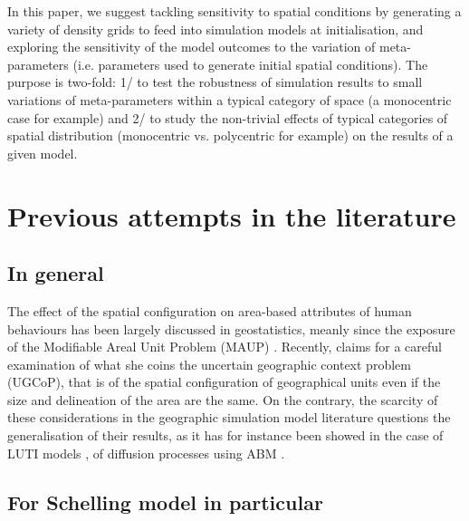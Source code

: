 \documentclass[Afour,sageh,times]{sagej}
\begin{document}
In this paper, we suggest tackling sensitivity to spatial conditions by generating a variety of density grids to feed into simulation models at initialisation, and exploring the sensitivity of the model outcomes to the variation of meta-parameters (i.e. parameters used to generate initial spatial conditions). The purpose is two-fold: 1/ to test the robustness of simulation results to small variations of meta-parameters within a typical category of space (a monocentric case for example) and 2/ to study the non-trivial effects of typical categories of spatial distribution (monocentric vs. polycentric for example) on the results of a given model.


\section{Previous attempts in the literature}

\subsection{In general}

The effect of the spatial configuration on area-based attributes of human behaviours has been largely discussed in geostatistics, meanly since the exposure of the Modifiable Areal Unit Problem (MAUP) \citep{Openshaw1984,FotheringhamWong1991}. Recently, \citet{Kwan2012} claims for a careful examination of what she coins the uncertain geographic context problem (UGCoP), that is of the spatial configuration of geographical units even if the size and delineation of the area are the same. On the contrary, the scarcity of these considerations in the geographic simulation model literature questions the generalisation of their results, as it has for instance been showed in the case of LUTI models \citep{Thomasetal2017}, of diffusion processes using ABM \citep{LeTexierCaruso2017}. 

\subsection{For Schelling model in particular}
\end{document}
